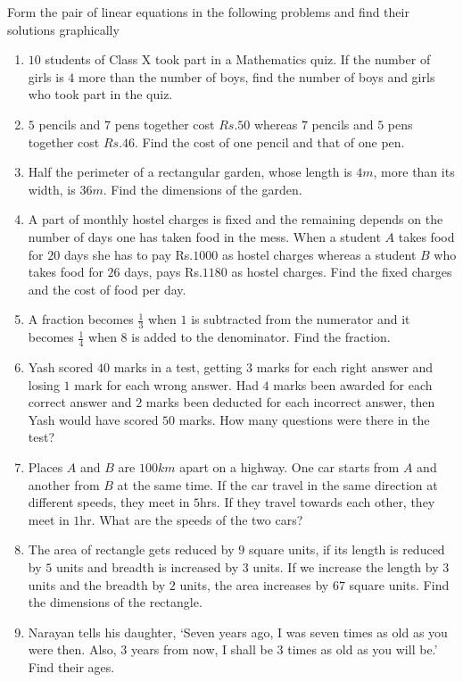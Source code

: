 Form the pair of linear equations in the following problems and find their solutions graphically
\begin{enumerate}[label=\thesubsection.\arabic*,ref=\thesubsection.\theenumi]
\item $10$ students of Class X took part in a Mathematics quiz. If the number of girls is $4$ more than the number of boys, find the number of boys and girls who took part in the quiz.
\item $5$ pencils and $7$ pens together cost $Rs. 50$ whereas $7$ pencils and $5$ pens together cost $Rs. 46$. Find the cost of one pencil and that of one pen.
\item Half the perimeter of a rectangular garden, whose length is $4m$, more than its width, is $36m$. Find the dimensions of the garden.
\item A part of monthly hostel charges is fixed and the remaining depends on the number of days one has taken food in the mess. When a student $A$ takes food for $20$ days she has to pay Rs.$1000$ as hostel charges whereas a student $B$ who takes food for $26$ days, pays Rs.$1180$ as hostel charges. Find the fixed charges and the cost of food per day.
\item A fraction becomes $\frac{1}{3}$ when $1$ is subtracted from the numerator and it becomes $\frac{1}{4}$ when $8$ is added to the denominator. Find the fraction.
\item Yash scored $40$ marks in a test, getting $3$ marks for each right answer and losing $1$ mark for each wrong answer. Had $4$ marks been awarded for each correct answer and $2$ marks been deducted for each incorrect answer, then Yash would have scored $50$ marks. How many questions were there in the test?
\item Places $A$ and $B$ are $100km$ apart on a highway. One car starts from $A$ and another from $B$ at the same time. If the car travel in the same direction at different speeds, they meet in $5$hrs. If they travel towards each other, they meet in $1$hr. What are the speeds of the two cars?
\item The area of rectangle gets reduced by $9$ square units, if its length is reduced by $5$ units and breadth is increased by $3$ units. If we increase the length by $3$ units and the breadth by $2$ units, the area increases by $67$ square units. Find the dimensions of the rectangle.
\item Narayan tells his daughter, `Seven years ago, I was seven times as old as you were then. Also, $3$ years from now, I shall be $3$ times as old as  you will be.' Find their ages. 

\end{enumerate}
